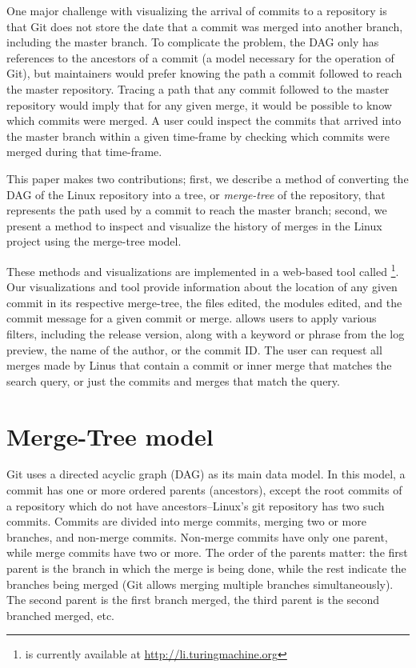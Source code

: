 \documentclass[conference, draftclsnofoot, draft]{IEEEtran}
\begin{document}
One major challenge with visualizing the arrival of commits to a repository is that
Git does not store the date that a commit was merged into another branch, including
the master branch. To complicate the problem, the DAG only has references to the
ancestors of a commit (a model necessary for the operation of Git), but maintainers
would prefer knowing the path a commit followed to reach the master repository.
Tracing a path that any commit followed to the master repository would imply that
for any given merge, it would be possible to know which commits were merged. A user
could inspect the commits that arrived into the master branch within a given
time-frame by checking which commits were merged during that time-frame.

This paper makes two contributions; first, we describe a method of converting the
DAG of the Linux repository into a tree, or \emph{merge-tree} of the repository,
that represents the path used by a commit to reach the master branch; second, we
present a method to inspect and visualize the history of merges in the Linux project
using the merge-tree model.

These methods and visualizations are implemented in a web-based tool called
\tool\footnote{\tool is currently available at \url{http://li.turingmachine.org}}.
Our visualizations and tool provide information about the location of any given
commit in its respective merge-tree, the files edited, the modules edited, and the
commit message for a given commit or merge. \tool allows users to apply various
filters, including the release version, along with a keyword or phrase from the log
preview, the name of the author, or the commit ID. The user can request all merges
made by Linus that contain a commit or inner merge that matches the search query, or
just the commits and merges that match the query.

\section{Merge-Tree model}
\label{sec:mergetree}

Git uses a directed acyclic graph (DAG) as its main data model. In this model, a
commit has one or more ordered parents (ancestors), except the root commits of a
repository which do not have ancestors--Linux's git repository has two such commits.
Commits are divided into merge commits, merging two or more branches, and non-merge
commits. Non-merge commits have only one parent, while merge commits have two or
more. The order of the parents matter: the first parent is the branch in which the
merge is being done, while the rest indicate the branches being merged (Git allows
merging multiple branches simultaneously). The second parent is the first branch
merged, the third parent is the second branched merged, etc.
\end{document}
